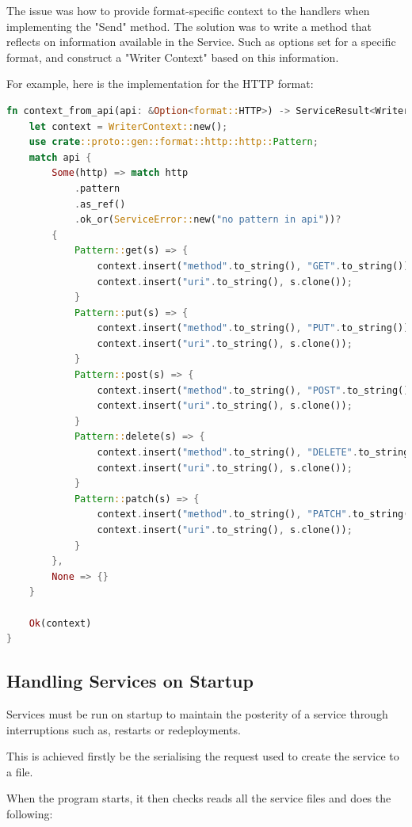 \documentclass[a4paper,12pt]{report}
\begin{document}
The issue was how to provide format-specific context to the handlers when implementing the "Send" method. The solution was to write a method that reflects on information available in the Service. Such as options set for a specific format, and construct a "Writer Context" based on this information.

For example, here is the implementation for the HTTP format:

\begin{lstlisting}[language=Rust]
fn context_from_api(api: &Option<format::HTTP>) -> ServiceResult<WriterContext> {
    let context = WriterContext::new();
    use crate::proto::gen::format::http::http::Pattern;
    match api {
        Some(http) => match http
            .pattern
            .as_ref()
            .ok_or(ServiceError::new("no pattern in api"))?
        {
            Pattern::get(s) => {
                context.insert("method".to_string(), "GET".to_string());
                context.insert("uri".to_string(), s.clone());
            }
            Pattern::put(s) => {
                context.insert("method".to_string(), "PUT".to_string());
                context.insert("uri".to_string(), s.clone());
            }
            Pattern::post(s) => {
                context.insert("method".to_string(), "POST".to_string());
                context.insert("uri".to_string(), s.clone());
            }
            Pattern::delete(s) => {
                context.insert("method".to_string(), "DELETE".to_string());
                context.insert("uri".to_string(), s.clone());
            }
            Pattern::patch(s) => {
                context.insert("method".to_string(), "PATCH".to_string());
                context.insert("uri".to_string(), s.clone());
            }
        },
        None => {}
    }

    Ok(context)
}
\end{lstlisting}

\subsection{Handling Services on Startup}

Services must be run on startup to maintain the posterity of a service through interruptions such as, restarts or redeployments.

This is achieved firstly be the  serialising the request used to create the service to a file.

When the program starts, it then checks reads all the service files and does the following:
\end{document}
